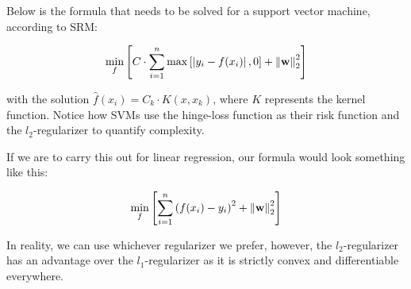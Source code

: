 Below is the formula that needs to be solved for a support vector machine, according to SRM:

\begin{equation}\label{srm2}
\centering
\underset{f}{\mathrm{min}}\left[C\cdot\sum_{i=1}^{n}{\mathrm{max}}\left[\left|y_{i}-f(x_{i})\right|,0\right]+\left\Vert \mathbf{w}\right\Vert_{2}^{2}\right]
\end{equation}

with the solution $\hat{f}(x_{i})=C_{k}\cdot K(x,x_{k})$, where $K$ represents the kernel function. Notice how SVMs use the hinge-loss function as their risk function and the $l_{2}$-regularizer to quantify complexity. 

If we are to carry this out for linear regression, our formula would
look something like this:

\begin{equation}\label{srm3}
\centering
\underset{f}{\mathrm{min}}\left[\sum_{i=1}^{n}\left(f(x_{i})-y_{i}\right)^{2}+\left\Vert \mathbf{w}\right\Vert _{2}^{2}\right]
\end{equation}

In reality, we can use whichever regularizer we prefer, however, the $l_{2}$-regularizer has an advantage over the $l_{1}$-regularizer as it is strictly convex and differentiable everywhere.


